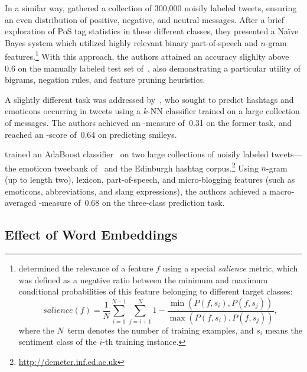 In a similar way, \citet{Pak:10} gathered a collection of 300,000
noisily labeled tweets, ensuring an even distribution of positive,
negative, and neutral messages.  After a brief exploration of PoS tag
statistics in these different classes, they presented a Na{\"i}ve
Bayes system which utilized highly relevant binary part-of-speech and
$n$-gram features.\footnote{\citet{Pak:10} determined the relevance of
  a feature $f$ using a special \emph{salience} metric, which was
  defined as a negative ratio between the minimum and maximum
  conditional probabilities of this feature belonging to different
  target classes:
  \begin{equation*}
    salience(f) = \frac{1}{N}\sum_{i=1}^{N-1}\sum_{j=i+1}^N 1 - \frac{\min(P(f, s_i), P(f, s_j))}{\max(P(f, s_i), P(f, s_j))},
  \end{equation*}
  where the $N$~term denotes the number of training examples, and
  $s_i$ means the sentiment class of the $i$-th training instance.}
With this approach, the authors attained an accuracy slighlty above
0.6 on the manually labeled test set of~\citet{Go:09}, also
demonstrating a particular utility of bigrams, negation rules, and
feature pruning heuristics.

A slightly different task was addressed by~\citet{Davidov:10}, who
sought to predict hashtags and emoticons occurring in tweets using a
$k$-NN classifier trained on a large collection of messages.  The
authors achieved an \F-measure of~0.31 on the former task, and reached
an \F-score of~0.64 on predicting smileys.

\citet{Kouloumpis:11} trained an AdaBoost
classifier~\cite{Schapire:00} on two large collections of noisily
labeled tweets---the emoticon tweebank of~\citet{Go:09} and the
Edinburgh hashtag corpus.\footnote{\url{http://demeter.inf.ed.ac.uk}}
Using $n$-gram (up to length two), lexicon, part-of-speech, and
micro-blogging features (such as emoticons, abbreviations, and slang
expressions), the authors achieved a macro-averaged \F-measure of~0.68
on the three-class prediction task.

\subsection{Effect of Word Embeddings}
